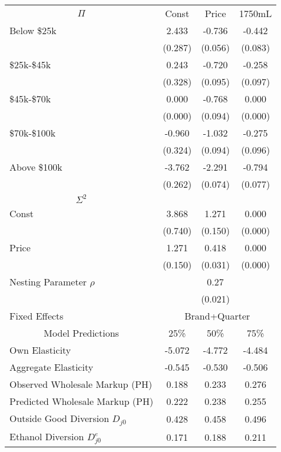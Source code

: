 \begin{tabular}{lccc} 
\toprule 
\multicolumn{1}{c}{$\Pi$} &  Const &  Price &  1750mL \\ 
\cmidrule(r){1-1} \cmidrule(rrr){2-4} 
Below \$25k & 2.433 & -0.736 & -0.442 \\
 & (0.287) & (0.056) & (0.083) \\
\$25k-\$45k & 0.243 & -0.720 & -0.258 \\
 & (0.328) & (0.095) & (0.097) \\
\$45k-\$70k & 0.000 & -0.768 & 0.000 \\
 & (0.000) & (0.094) & (0.000) \\
\$70k-\$100k & -0.960 & -1.032 & -0.275 \\
 & (0.324) & (0.094) & (0.096) \\
Above \$100k & -3.762 & -2.291 & -0.794 \\
 & (0.262) & (0.074) & (0.077) \\
\midrule \multicolumn{1}{c}{$\Sigma^2$}& \multicolumn{2}{c}{} \\ \cmidrule(r){1-1} \cmidrule(rrr){2-4}
Const & 3.868 & 1.271 & 0.000 \\
 & (0.740) & (0.150) & (0.000) \\
Price & 1.271 & 0.418 & 0.000 \\
 & (0.150) & (0.031) & (0.000) \\
\midrule  
\multicolumn{1}{l}{Nesting Parameter $\rho$} &  &0.27&    \\ 
& &(0.021)&     \\ 
\multicolumn{1}{l}{Fixed Effects} &   \multicolumn{3}{c}{Brand+Quarter}\\ 
\midrule 
\multicolumn{1}{c}{Model Predictions}& 25\% & 50\% & 75\% \\ \midrule\midrule
Own Elasticity & -5.072 & -4.772 & -4.484 \\
Aggregate Elasticity & -0.545 & -0.530 & -0.506 \\
Observed Wholesale Markup (PH) & 0.188 & 0.233 & 0.276 \\
Predicted Wholesale Markup (PH) & 0.222 & 0.238 & 0.255 \\
Outside Good Diversion $D_{j0}$ & 0.428 & 0.458 & 0.496 \\
Ethanol Diversion $D_{j0}^e$ & 0.171 & 0.188 & 0.211 \\
\bottomrule 
\end{tabular}